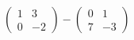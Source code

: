 \hspace*{2mm}\begin{minipage}[t]{\dimexpr\linewidth-2mm\relax}\vspace{0pt}
$\begin{pmatrix} 1 & 3 \\ 0 & -2 \end{pmatrix}-\begin{pmatrix} 0 & 1 \\ 7 & -3 \end{pmatrix}$\end{minipage}
